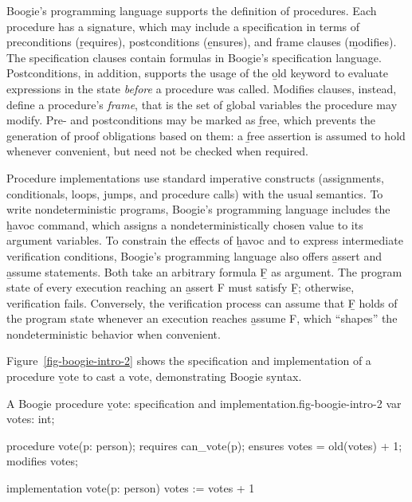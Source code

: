 Boogie's programming language supports the definition of procedures.
Each procedure has a signature, which may include a specification in
terms of preconditions (\b{requires}), postconditions
(\b{ensures}), and frame clauses (\b{modifies}).  The
specification clauses contain formulas in Boogie's specification
language.  Postconditions, in addition, supports the usage of the
\b{old} keyword to evaluate expressions in the state
\emph{before} a procedure was called.  Modifies clauses, instead,
define a procedure's \emph{frame}, that is the set of global variables
the procedure may modify.  Pre- and postconditions may be marked as
\b{free}, which prevents the generation of proof obligations
based on them: a \b{free} assertion is assumed to hold whenever
convenient, but need not be checked when required.

Procedure implementations use standard imperative constructs
(assignments, conditionals, loops, jumps, and procedure calls) with
the usual semantics.  To write nondeterministic programs, Boogie's
programming language includes the \b{havoc} command, which
assigns a nondeterministically chosen value to its argument variables.
To constrain the effects of \b{havoc} and to express intermediate
verification conditions, Boogie's programming language also offers
\b{assert} and \b{assume} statements.  Both take an
arbitrary formula \b{F} as argument. The program state of every
execution reaching an \b{assert F} must satisfy \b{F};
otherwise, verification fails.  Conversely, the verification process
can assume that \b{F} holds of the program state whenever an
execution reaches \b{assume F}, which ``shapes'' the
nondeterministic behavior when convenient.


Figure~\ref{fig-boogie-intro-2} shows the specification and implementation of a procedure \b{vote} to cast a vote, demonstrating Boogie syntax.

\begin{bfigure}[ht]{A Boogie procedure \b{vote}: specification and implementation.}{fig-boogie-intro-2}
var votes: int;

procedure vote(p: person);
	requires can_vote(p);
	ensures votes = old(votes) + 1;
	modifies votes;

implementation vote(p: person) {
	votes := votes + 1
}
\end{bfigure}
